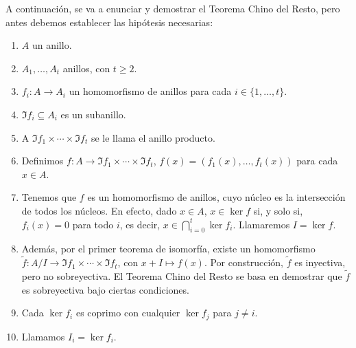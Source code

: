 A continuación, se va a enunciar y demostrar el Teorema Chino del Resto, pero antes
debemos establecer las hipótesis necesarias:
  \begin{enumerate}
    \item \(A\) un anillo.
    \item \(A_1,\ldots,A_t\) anillos, con \(t \ge 2\).
    \item \(f_i:A\longrightarrow A_i\) un homomorfismo de anillos
      para cada \(i\in\{1,\ldots,t\}\).
    \item \(\Im f_i\subseteq A_i\) es un subanillo.
    \item A \(\Im f_1\times\cdots\times\Im f_t\) se le llama el anillo
      producto.
    \item Definimos \(f:A\longrightarrow\Im f_1\times\cdots\times\Im f_t\),
      \(f(x)=(f_1(x),\ldots,f_t(x))\) para cada \(x\in A\).
    \item Tenemos que \(f\) es un homomorfismo de anillos, cuyo núcleo es la
      intersección de todos los núcleos.
      En efecto, dado \(x\in A\), \(x\in\ker f\) si, y solo si, \(f_i(x)=0\) para todo \(i\),
      es decir, \(x\in\bigcap_{i=0}^t \ker f_i\). Llamaremos \(I=\ker f\).
    \item  Además, por el primer teorema de isomorfía, existe un homomorfismo
    \(\tilde{f}:A/I \longrightarrow\Im f_1\times\cdots\times\Im f_t\),
      con \(x+I\mapsto f(x)\). Por construcción, \(\tilde{f}\) es inyectiva, 
      pero no sobreyectiva. El Teorema Chino del Resto se basa en demostrar
      que \(\tilde{f}\) es sobreyectiva bajo ciertas condiciones.
    \item Cada \(\ker f_i\) es coprimo con cualquier \(\ker f_j\)
      para \(j\neq i\).
    \item Llamamos \(I_i=\ker f_i\).
  \end{enumerate}

